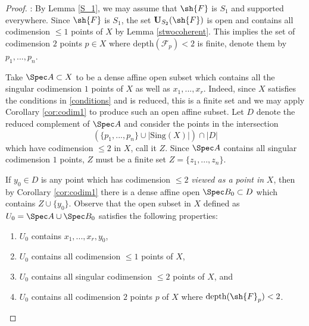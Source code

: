 \documentclass[12pt]{amsart}
\begin{document}
\begin{proof}: By Lemma \ref{S_1}, we may assume that $\sh{F}$ is $S_1$ and supported everywhere. Since $\sh{F}$ is $S_1$, the set $\mathbf{U}_{S_2}(\sh{F})$ is open and contains all codimension $\leq 1$ points of $X$ by Lemma \ref{stwocoherent}. This implies the set of codimension $2$ points $p \in X$ where $\text{depth}(\mathcal{F}_p)<2$ is finite, denote them by $p_1,...,p_n$. 


Take $\Spec A \subset X$ to be a dense affine open subset which contains all the singular codimension $1$ points of $X$ as well as $x_1,...,x_r$. Indeed, since $X$ satisfies the conditions in \ref{conditions} and is reduced, this is a finite set and we may apply Corollary \ref{cor:codim1} to produce such an open affine subset. Let $D$ denote the reduced complement of $\Spec A$ and consider the points in the intersection 
\[(\{p_1,...,p_n\} \cup |\text{Sing}(X)|) \cap |D|\]
which have codimension $\leq 2$ in $X$, call it $Z$. Since $\Spec A$ contains all singular codimension $1$ points, $Z$ must be a finite set $Z=\{z_1,...,z_n\}$. 

If $y_0 \in D$ is any point which has codimension $\leq 2$ \emph{viewed as a point in} $X$, then by Corollary \ref{cor:codim1} there is a dense affine open $\Spec B_0 \subset D$ which contains $Z \cup \{y_0\}$. Observe that the open subset in $X$ defined as $U_{0}=\Spec A \cup \Spec B_0$ satisfies the following properties:
\begin{enumerate}
\item $U_{0}$ contains $x_1,...,x_r,y_0$,
\item $U_{0}$ contains all codimension $\leq 1$ points of $X$,
\item $U_{0}$ contains all singular codimension $\leq 2$ points of $X$, and
\item $U_{0}$ contains all codimension $2$ points $p$ of $X$ where $\mathrm{depth}(\sh{F}_p)<2$.
\end{enumerate}


\end{proof}
\end{document}
